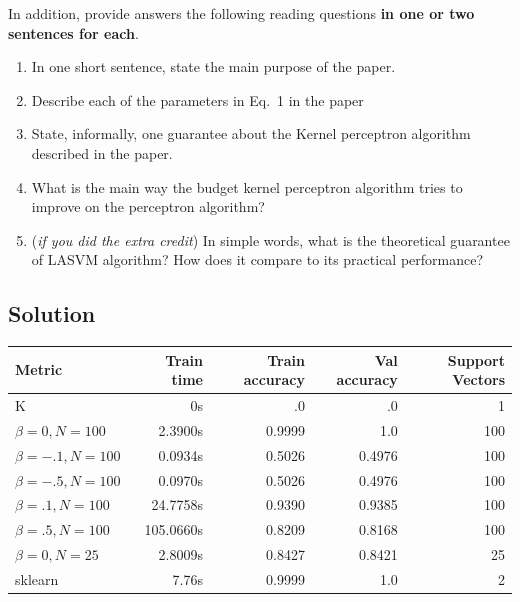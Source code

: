 \documentclass[submit]{harvardml}
\begin{document}
\begin{problem}
In addition, provide answers the following reading questions
{\bf in one or two sentences for each}.
%
\begin{enumerate}
\item In one short sentence, state the main purpose of the paper.
\item Describe each of the parameters in Eq.~1 in the paper
\item State, informally, one guarantee about the Kernel perceptron algorithm described in the
  paper.
\item What is the main way the budget kernel perceptron algorithm tries to
  improve on the perceptron algorithm?
\item ({\em if you did the extra credit}) In simple words, what is the theoretical guarantee of LASVM algorithm? How
  does it compare to its practical performance?
\end{enumerate}


\end{problem}

\subsection*{Solution}

\begin{center}
\begin{tabular} {l r r r r}
    \hline
    Metric & Train time & Train accuracy & Val accuracy & Support Vectors \\ \hline
    K & 0s & .0 & .0 & 1 \\
    $\beta=0, N=100$ & 2.3900s & 0.9999 & 1.0 & 100 \\
    $\beta=-.1, N=100$ & 0.0934s & 0.5026 & 0.4976 & 100 \\
    $\beta=-.5, N=100$ & 0.0970s & 0.5026 & 0.4976 & 100 \\
    $\beta=.1, N=100$ & 24.7758s & 0.9390 & 0.9385 & 100 \\
    $\beta=.5, N=100$ & 105.0660s & 0.8209 & 0.8168 & 100 \\
    $\beta=0, N=25$ & 2.8009s & 0.8427 & 0.8421 & 25 \\
    sklearn & 7.76s & 0.9999 & 1.0 & 2
\end{tabular}
\end{center}
\end{document}
